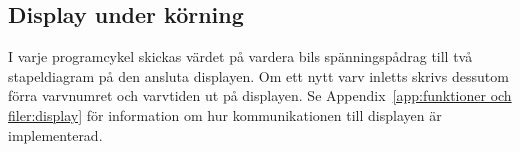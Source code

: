 \subsection{Display under körning}

I varje programcykel skickas värdet på vardera bils spänningspådrag till två
stapeldiagram på den ansluta displayen. Om ett nytt varv inletts skrivs dessutom
förra varvnumret och varvtiden ut på displayen. Se Appendix~\ref{app:funktioner
och filer:display} för information om hur kommunikationen till displayen
är implementerad.


